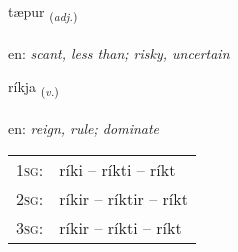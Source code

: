 \documentclass[frontgrid, backgrid]{flacards}\usepackage[]{graphicx}\usepackage[]{color}
\begin{document}
\renewcommand{\flhead}{\vskip5pt \fboxsep=0pt {\small\bfseries\footnotesize Lýsingarorð | Adjective}}
\renewcommand{\fcfoot}{\vskip5pt \fboxsep=0pt \hspace{2pt}{\small\bfseries\footnotesize 2K}}

\renewcommand{\blhead}{\vskip5pt {\small\bfseries\footnotesize Lýsingarorð | Adjective }}
\renewcommand{\bcfoot}{\vskip5pt \hspace{2pt}{\small\bfseries\footnotesize 2K}}


{tæpur \small{\textsubscript{(\textit{adj.})}} \\[1ex] %
\textphonetic{[tʰaiːpʏr]} \\
en: \emph{scant, less than; risky, uncertain} \\  [2ex]
\renewcommand*{\arraystretch}{0.8}
}

\renewcommand{\flhead}{\vskip5pt \fboxsep=0pt {\small\bfseries\footnotesize Sagnorð | Verb}}
\renewcommand{\fcfoot}{\vskip5pt \fboxsep=0pt \hspace{2pt}{\small\bfseries\footnotesize 2K}}

\renewcommand{\blhead}{\vskip5pt {\small\bfseries\footnotesize Sagnorð | Verb }}
\renewcommand{\bcfoot}{\vskip5pt \hspace{2pt}{\small\bfseries\footnotesize 2K}}


{ríkja \small{\textsubscript{(\textit{v.})}} \\[1ex] %
\textphonetic{[riːca]} \\
en: \emph{reign, rule; dominate} \\  [2ex]
\renewcommand*{\arraystretch}{0.8}
\begin{tabular}{p{1cm}l}
\textsc{1sg}: & ríki -- ríkti -- ríkt \\ 
\textsc{2sg}: & ríkir -- ríktir -- ríkt \\ 
\textsc{3sg}: & ríkir -- ríkti -- ríkt \\ 
\end{tabular}
}
\end{document}
